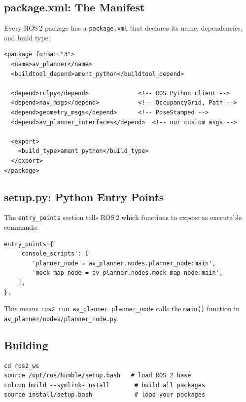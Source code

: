\documentclass[12pt, a4paper]{article}
\begin{document}
\subsection{package.xml: The Manifest}

Every ROS\,2 package has a \texttt{package.xml} that declares its name,
dependencies, and build type:

\begin{lstlisting}[style=xml, caption={av\_planner/package.xml (key parts)}]
<package format="3">
  <name>av_planner</name>
  <buildtool_depend>ament_python</buildtool_depend>

  <depend>rclpy</depend>              <!-- ROS Python client -->
  <depend>nav_msgs</depend>           <!-- OccupancyGrid, Path -->
  <depend>geometry_msgs</depend>      <!-- PoseStamped -->
  <depend>av_planner_interfaces</depend>  <!-- our custom msgs -->

  <export>
    <build_type>ament_python</build_type>
  </export>
</package>
\end{lstlisting}

\subsection{setup.py: Python Entry Points}

The \texttt{entry\_points} section tells ROS\,2 which functions to expose
as executable commands:

\begin{lstlisting}[style=python, caption={setup.py entry points}]
entry_points={
    'console_scripts': [
        'planner_node = av_planner.nodes.planner_node:main',
        'mock_map_node = av_planner.nodes.mock_map_node:main',
    ],
},
\end{lstlisting}

This means \texttt{ros2 run av\_planner planner\_node} calls the
\texttt{main()} function in \texttt{av\_planner/nodes/planner\_node.py}.

\subsection{Building}

\begin{lstlisting}[style=bash, caption={Build and source}]
cd ros2_ws
source /opt/ros/humble/setup.bash   # load ROS 2 base
colcon build --symlink-install       # build all packages
source install/setup.bash            # load your packages
\end{lstlisting}
\end{document}
